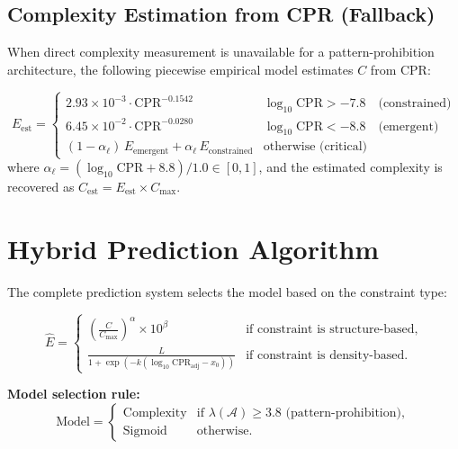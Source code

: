 \documentclass[12pt,a4paper]{article}
\begin{document}
\subsection{Complexity Estimation from CPR (Fallback)}\label{sec:fallback}

When direct complexity measurement is unavailable for a pattern-prohibition architecture, the following piecewise empirical model estimates $C$ from CPR:

\begin{equation}\label{eq:fallback}
E_{\text{est}} = \begin{cases}
2.93\times10^{-3} \cdot \mathrm{CPR}^{-0.1542}
    & \log_{10}\mathrm{CPR} > -7.8 \quad \text{(constrained)}\\[4pt]
6.45\times10^{-2} \cdot \mathrm{CPR}^{-0.0280}
    & \log_{10}\mathrm{CPR} < -8.8 \quad \text{(emergent)}\\[4pt]
(1-\alpha_{\ell})\,E_{\text{emergent}} + \alpha_{\ell}\,E_{\text{constrained}}
    & \text{otherwise (critical)}
\end{cases}
\end{equation}
where $\alpha_{\ell} = (\log_{10}\mathrm{CPR} + 8.8)/1.0 \in [0,1]$, and the estimated complexity is recovered as $C_{\text{est}} = E_{\text{est}} \times C_{\max}$.

\section{Hybrid Prediction Algorithm}\label{sec:hybrid}

The complete prediction system selects the model based on the constraint type:

\begin{equation}\label{eq:hybrid}
\hat{E} = \begin{cases}
\displaystyle\left(\frac{C}{C_{\max}}\right)^{\!\alpha}\!\!\times 10^{\beta}
    & \text{if constraint is structure-based,}\\[10pt]
\displaystyle\frac{L}{1+\exp(-k(\log_{10}\mathrm{CPR}_{\text{adj}}-x_{0}))}
    & \text{if constraint is density-based.}
\end{cases}
\end{equation}

\noindent\textbf{Model selection rule:}
\[
\text{Model} = \begin{cases}
\text{Complexity} & \text{if } \lambda(\mathcal{A}) \geq 3.8 \text{ (pattern-prohibition)},\\
\text{Sigmoid}    & \text{otherwise.}
\end{cases}
\]
\end{document}
